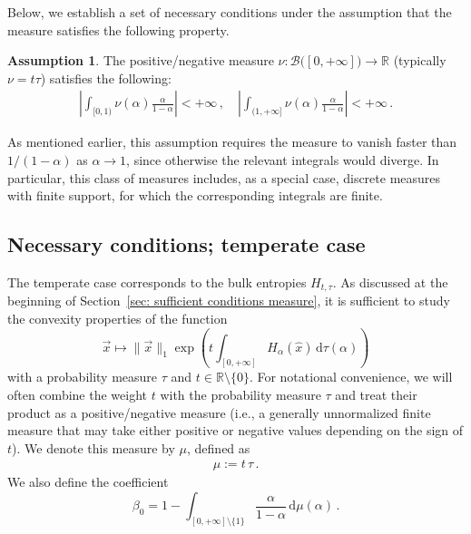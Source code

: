 \documentclass[aps,pra,11pt,onecolumn,nofootinbib,tightenlines]{revtex4-2}
\theoremstyle{definition}
\newtheorem{assumption}{Assumption}
\def \d {\mathrm{d}}
\newcommand{\R}{\mathbb{R}}
\newcommand{\mc}[1]{\mathcal{#1}}
\newcommand{\mb}[1]{\mathbb{#1}}
\begin{document}
Below, we establish a set of necessary conditions under the assumption that the measure satisfies the following property.
\begin{assumption}\label{assumption:finite integrals}
The positive/negative measure $\nu:\mc B\big([0,+\infty]\big)\to\mb R$ (typically $\nu=t\tau$) satisfies the following:
\begin{align}
\left|\int_{[0,1)}\nu(\alpha)\frac{\alpha}{1-\alpha}\right| <+\infty\,,\quad \left|\int_{(1,+\infty]}\nu(\alpha)\frac{\alpha}{1-\alpha}\right|<+\infty\,.
\end{align}
\end{assumption}
As mentioned earlier, this assumption requires the measure to vanish faster than $1/(1-\alpha)$ as $\alpha \to 1$, since otherwise the relevant integrals would diverge. In particular, this class of measures includes, as a special case, discrete measures with finite support, for which the corresponding integrals are finite.



\subsection{Necessary conditions; temperate case}
The temperate case corresponds to the bulk entropies $H_{t,\tau}$.
As discussed at the beginning of Section~\ref{sec: sufficient conditions measure}, it is sufficient to study the convexity properties of the function
\begin{equation}
    \vec{x} \longmapsto \|\vec{x}\|_1 \exp\left( t\int_{[0,+\infty]} H_\alpha(\hat{x}) \,\d\tau(\alpha) \right)
\end{equation}
with a probability measure $\tau$ and $t\in\R\setminus\{0\}$. For notational convenience, we will often combine the weight $t$ with the probability measure $\tau$ and treat their product as a positive/negative measure (i.e., a generally unnormalized finite measure that may take either positive or negative values depending on the sign of $t$). We denote this measure by $\mu$, defined as
\begin{align}
    \mu := t\,\tau \, .
\end{align}
We also define the coefficient
\begin{equation}
\label{eq: definition beta0}
     \beta_0 = 1 - \int_{[0,+\infty]\setminus\{1\}} \frac{\alpha}{1 - \alpha} \, \mathrm{d}\mu(\alpha) \,.
\end{equation}
\end{document}
